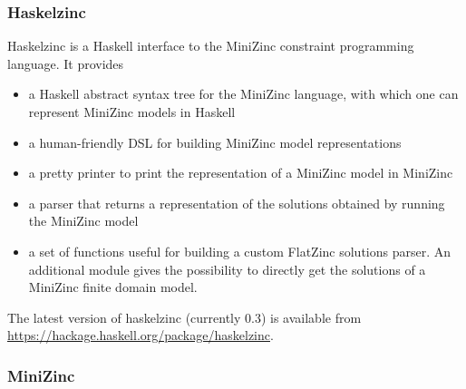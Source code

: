 \subsubsection{Haskelzinc}

Haskelzinc is a Haskell interface to the MiniZinc constraint
programming language.
%
It provides
\begin{itemize}
\item a Haskell abstract syntax tree for the MiniZinc language, with
  which one can represent MiniZinc models in Haskell
\item a human-friendly DSL for building MiniZinc model representations
\item a pretty printer to print the representation of a MiniZinc model
  in MiniZinc
\item a parser that returns a representation of the solutions obtained
  by running the MiniZinc model
\item a set of functions useful for building a custom FlatZinc
  solutions parser.
  An additional module gives the possibility to directly get the
  solutions of a MiniZinc finite domain model.
\end{itemize}

The latest version of haskelzinc (currently 0.3) is available from
\url{https://hackage.haskell.org/package/haskelzinc}.

\subsubsection{MiniZinc}



